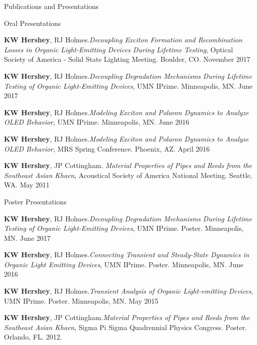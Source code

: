 \documentclass{resume} %
\begin{document}
\begin{rSection}{Publications and Presentations}
\begin{rSubsection}{Oral Presentations}{}{}{}
\item \textbf{KW Hershey}, RJ Holmes.{\em Decoupling Exciton Formation and Recombination Losses in Organic Light-Emitting Devices During Lifetime Testing}, Optical Society of America - Solid State Lighting Meeting. Boulder, CO. November 2017
\item \textbf{KW Hershey}, RJ Holmes.{\em Decoupling Degradation Mechanisms During Lifetime Testing of Organic Light-Emitting Devices}, UMN IPrime. Minneapolis, MN. June 2017 
\item \textbf{KW Hershey}, RJ Holmes.{\em Modeling Exciton and Polaron Dynamics to Analyze OLED Behavior}, UMN IPrime. Minneapolis, MN. June 2016 
\item \textbf{KW Hershey}, RJ Holmes.{\em Modeling Exciton and Polaron Dynamics to Analyze OLED Behavior}, MRS Spring Conference. Phoenix, AZ. April 2016 
\item \textbf{KW Hershey}, JP Cottingham. {\em Material Properties of Pipes and Reeds from the Southeast Asian Khaen}, Acoustical Society of America National Meeting. Seattle, WA. May 2011 
\end{rSubsection}
\begin{rSubsection}{Poster Presentations}{}{}{}
\item \textbf{KW Hershey}, RJ Holmes.{\em Decoupling Degradation Mechanisms During Lifetime Testing of Organic Light-Emitting Devices}, UMN IPrime. Poster. Minneapolis, MN. June 2017 
\item \textbf{KW Hershey}, RJ Holmes.{\em Connecting Transient and Steady-State Dynamics in Organic Light Emitting Devices}, UMN IPrime. Poster. Minneapolis, MN. June 2016 
\item \textbf{KW Hershey}, RJ Holmes.{\em Transient Analysis of Organic Light-emitting Devices}, UMN IPrime. Poster. Minneapolis, MN. May 2015 
\item \textbf{KW Hershey}, JP Cottingham.{\em Material Properties of Pipes and Reeds from the Southeast Asian Khaen}, Sigma Pi Sigma Quadrennial Physics Congress. Poster. Orlando, FL. 2012.

\end{rSubsection}
\end{rSection}
\end{document}
